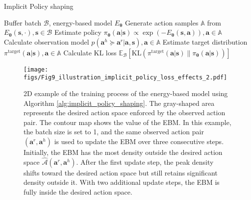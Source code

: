 \begin{algorithm}[]
        \caption{Implicit Policy shaping}
        \label{alg:implicit_policy_shaping}
        \begin{algorithmic}[1]
        \Require  Buffer batch \( \mathcal B \), energy-based model $E_{\bm \theta}$
        \State Generate action samples $\mathbb A$ from $E_{\bm \theta}(\bm s, \cdot), \bm s \in \mathcal{ B}$ \label{alg:line:MCMC}
        \State Estimate policy $\pi_{\bm \theta}(\bm a | \bm s) \! \propto {\exp(-E_{\bm \theta}(\bm s, \bm a))}, \bm a \in \mathbb A$  \label{alg:line:estimate_policy}
        \State Calculate observation model $p(\bm a^h \succeq \bm a^r | \bm a, \bm s), \bm a \in \mathbb A$
        \State Estimate target distribution $\pi^{\text{target}}(\bm a| \bm s) , \bm a \in \mathbb A $\label{alg:line:estimate_target}
        \State Calculate KL loss $\mathbb{E}_{\mathcal{B}} \left[ \mathrm{KL}\!\left( \pi^{\text{target}}(\bm a| \bm s) \big\| \pi_{\bm \theta}(\bm a | \bm s) \right) \! \right] $\label{alg:line:KL_loss}
        \end{algorithmic}
        \end{algorithm}

        \begin{figure}
    \centering
    \texttt{[image: figs/Fig9\_illustration\_implicit\_policy\_loss\_effects\_2.pdf]}
    \vspace*{-5mm}
	\caption{2D example of the training process of the energy-based model using Algorithm \ref{alg:implicit_policy_shaping}. The gray-shaped area represents the desired action space enforced by the observed action pair. The contour map shows the value of the EBM. In this example, the batch size is set to 1, and the same observed action pair $(\bm a^r, \bm a^h)$ is used to update the EBM over three consecutive steps. 
Initially, the EBM has the most density outside the desired action space $\hat{\mathcal{A}} (\bm a^r, \bm a^h)$. After the first update step, the peak density shifts toward the desired action space but still retains significant density outside it. 
With two additional update steps, the EBM is fully inside the desired action space.  }
 \label{fig:Fig9_illustration_implicit_policy_loss_effects}
\end{figure}
        
